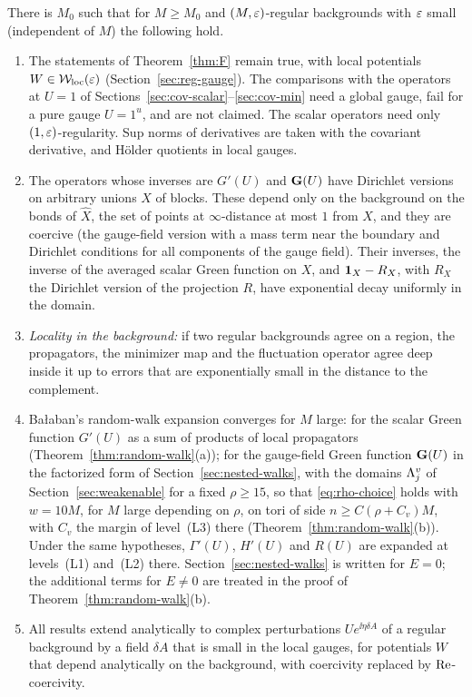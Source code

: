 \begin{maintheorem}\label{thm:G}
There is $M_0$ such that for $M\ge M_0$ and $(M,\varepsilon)$-regular backgrounds with $\varepsilon$ small (independent of $M$) the following hold.
\begin{enumerate}[label=(\roman*)]
\item The statements of Theorem~\ref{thm:F} remain true, with local potentials $W\in\mathcal W_{\rm loc}(\varepsilon)$ (Section~\ref{sec:reg-gauge}). The comparisons with the operators at $U=1$ of Sections~\ref{sec:cov-scalar}--\ref{sec:cov-min} need a global gauge, fail for a pure gauge $U=1^u$, and are not claimed. The scalar operators need only $(1,\varepsilon)$-regularity. Sup norms of derivatives are taken with the covariant derivative, and H\"older quotients in local gauges.
\item The operators whose inverses are $G'(U)$ and $\mathbf G(U)$ have Dirichlet versions on arbitrary unions $X$ of blocks. These depend only on the background on the bonds of $\hat X$, the set of points at $\infty$-distance at most $1$ from $X$, and they are coercive (the gauge-field version with a mass term near the boundary and Dirichlet conditions for all components of the gauge field). Their inverses, the inverse of the averaged scalar Green function on $X$, and $\mathbf 1_X-R_X$, with $R_X$ the Dirichlet version of the projection $R$, have exponential decay uniformly in the domain.
\item \emph{Locality in the background:} if two regular backgrounds agree on a region, the propagators, the minimizer map and the fluctuation operator agree deep inside it up to errors that are exponentially small in the distance to the complement.
\item Ba\l aban's random-walk expansion converges for $M$ large: for the scalar Green function $G'(U)$ as a sum of products of local propagators (Theorem~\ref{thm:random-walk}(a)); for the gauge-field Green function $\mathbf G(U)$ in the factorized form of Section~\ref{sec:nested-walks}, with the domains $\Lambda^v_j$ of Section~\ref{sec:weakenable} for a fixed $\rho\ge15$, so that \eqref{eq:rho-choice} holds with $w=10M$, for $M$ large depending on $\rho$, on tori of side $n\ge C(\rho+C_v)M$, with $C_v$ the margin of level~(L3) there (Theorem~\ref{thm:random-walk}(b)). Under the same hypotheses, $\Gamma'(U)$, $H'(U)$ and $R(U)$ are expanded at levels~(L1) and~(L2) there. Section~\ref{sec:nested-walks} is written for $E=0$; the additional terms for $E\ne0$ are treated in the proof of Theorem~\ref{thm:random-walk}(b).
\item All results extend analytically to complex perturbations $Ue^{\ii\eta\delta A}$ of a regular background by a field $\delta A$ that is small in the local gauges, for potentials $W$ that depend analytically on the background, with coercivity replaced by $\operatorname{Re}$-coercivity.
\end{enumerate}
\end{maintheorem}

